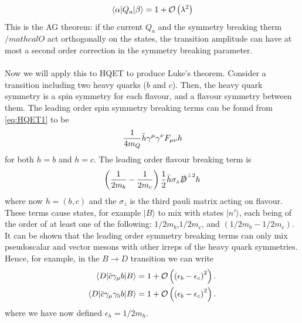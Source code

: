 \begin{align}
	\langle \alpha | Q_a | \beta \rangle = 1 + \mathcal{O}\left( \lambda^2 \right)
\end{align}
This is the AG theorem: if the current $Q_a$ and the symmetry breaking therm $/mathcal{O}$ act orthogonally on the states, the transition amplitude can have at most a second order correction in the symmetry breaking parameter.
\\ \\
Now we will apply this to HQET to produce Luke's theorem. Consider a transition including two heavy quarks ($b$ and $c$). Then, the heavy quark symmetry is a spin symmetry for each flavour, and a flavour symmetry between them. The leading order spin symmetry breaking terms can be found from \eqref{eq:HQET1} to be
\begin{align}
	{1\over 4m_Q} \bar{h} \gamma^{\mu} \gamma^{\nu} F_{\mu\nu} h 
\end{align}
for both $h=b$ and $h=c$. The leading order flavour breaking term is
\begin{align}
	\left({1\over 2m_b} - {1\over 2m_c} \right) {1\over 2} \bar{h} \sigma_z \slashed{D}^{\perp 2} h
\end{align}
where now $h = (b,c)$ and the $\sigma_z$ is the third pauli matrix acting on flavour. These terms cause states, for example $| B \rangle$ to mix with states $|n'\rangle$, each being of the order of at least one of the following: $1/2m_b$,$1/2m_c$, and $(1/2m_b - 1/2m_c)$. It can be shown \cite{Lebed:1991sq} that the leading order symmetry breaking terms can only mix pseudoscalar and vector mesons with other irreps of the heavy quark symmetries. Hence, for example, in the $B \to D$ transition we can write
\begin{align}
	\langle D | \bar{c}\gamma_{\mu} b | B \rangle &= 1 + \mathcal{O}\left( \left( \epsilon_b - \epsilon_c \right)^2 \right). \\
	\langle D | \bar{c}\gamma_{\mu}\gamma_5 b | B \rangle &= 1 + \mathcal{O}\left( \left( \epsilon_b - \epsilon_c \right)^2 \right).
\end{align}
where we have now defined $\epsilon_h = 1/2m_h$. 



